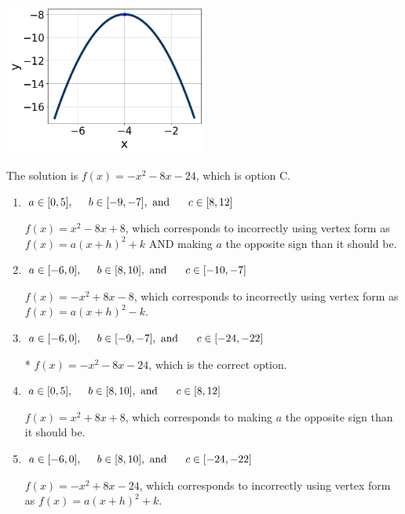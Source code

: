 \documentclass{extbook}[14pt]
\begin{document}
\begin{enumerate}
{\begin{center}
    \includegraphics[width=0.5\textwidth]{../Figures/quadraticGraphToEquationCopyC.png}
\end{center}


The solution is \( f(x) = -x^{2} -8 x -24 \), which is option C.\begin{enumerate}[label=\Alph*.]
\item \( a \in [0, 5], \hspace*{5mm} b \in [-9, -7], \text{ and } \hspace*{5mm} c \in [8, 12] \)

$f(x)=x^{2} -8 x + 8$, which corresponds to incorrectly using vertex form as $f(x) = a(x+h)^2+k$ AND making $a$ the opposite sign than it should be.
\item \( a \in [-6, 0], \hspace*{5mm} b \in [8, 10], \text{ and } \hspace*{5mm} c \in [-10, -7] \)

$f(x)=-x^{2} +8 x -8$, which corresponds to incorrectly using vertex form as $f(x) = a(x+h)^2 - k$.
\item \( a \in [-6, 0], \hspace*{5mm} b \in [-9, -7], \text{ and } \hspace*{5mm} c \in [-24, -22] \)

* $f(x)=-x^{2} -8 x -24$, which is the correct option.
\item \( a \in [0, 5], \hspace*{5mm} b \in [8, 10], \text{ and } \hspace*{5mm} c \in [8, 12] \)

$f(x)=x^{2} +8 x + 8$, which corresponds to making $a$ the opposite sign than it should be.
\item \( a \in [-6, 0], \hspace*{5mm} b \in [8, 10], \text{ and } \hspace*{5mm} c \in [-24, -22] \)

$f(x)=-x^{2} +8 x -24$, which corresponds to incorrectly using vertex form as $f(x) = a(x+h)^2+k$.
\end{enumerate}

}
\end{enumerate}
\end{document}

